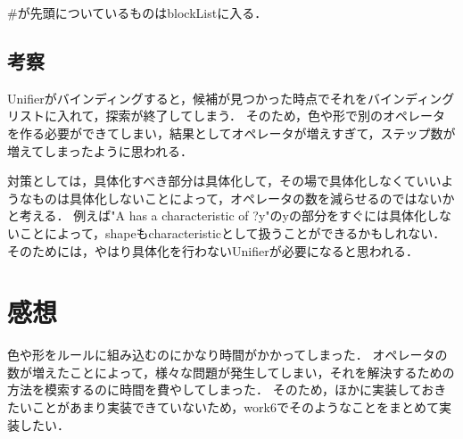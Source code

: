 \documentclass{jarticle}
\begin{document}
\#が先頭についているものはblockListに入る．

\subsection{考察}
Unifierがバインディングすると，候補が見つかった時点でそれをバインディングリストに入れて，探索が終了してしまう．
そのため，色や形で別のオペレータを作る必要ができてしまい，結果としてオペレータが増えすぎて，ステップ数が増えてしまったように思われる．

対策としては，具体化すべき部分は具体化して，その場で具体化しなくていいようなものは具体化しないことによって，オペレータの数を減らせるのではないかと考える．
例えば"A has a characteristic of ?y"のyの部分をすぐには具体化しないことによって，shapeもcharacteristicとして扱うことができるかもしれない．
そのためには，やはり具体化を行わないUnifierが必要になると思われる．

\section{感想}
色や形をルールに組み込むのにかなり時間がかかってしまった．
オペレータの数が増えたことによって，様々な問題が発生してしまい，それを解決するための方法を模索するのに時間を費やしてしまった．
そのため，ほかに実装しておきたいことがあまり実装できていないため，work6でそのようなことをまとめて実装したい．
\end{document}
